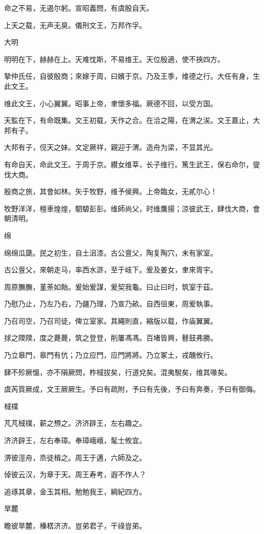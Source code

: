 命之不易，无遏尔躬。宣昭義問，有虞殷自天。

上天之载，无声无臭。儀刑文王，万邦作孚。

大明

明明在下，赫赫在上。天难忱斯，不易维王。天位殷適，使不挾四方。

摯仲氏任，自彼殷商；來嫁于周，曰嬪于京。乃及王季，维德之行。大任有身，生此文王。

维此文王，小心翼翼。昭事上帝，聿懷多福。厥德不回，以受方国。

天監在下，有命既集。文王初载，天作之合。在洽之陽，在渭之涘。文王嘉止，大邦有子。

大邦有子，伣天之妹。文定厥祥，親迎于渭。造舟为梁，不显其光。

有命自天，命此文王。于周于京。纘女维莘，长子维行。篤生武王，保右命尔，燮伐大商。

殷商之旅，其會如林。矢于牧野，维予侯興。上帝臨女，无貳尔心！

牧野洋洋，檀車煌煌，駟騵彭彭。维師尚父，时维鷹揚；涼彼武王，肆伐大商，會朝清明。

绵

绵绵瓜瓞。民之初生，自土沮漆。古公亶父，陶复陶穴，未有家室。

古公亶父，來朝走马，率西水滸，至于岐下。爰及姜女，聿來胥宇。

周原膴膴，堇荼如飴。爰始爰謀，爰契我龜。曰止曰时，筑室于茲。

乃慰乃止，乃左乃右，乃疆乃理，乃宣乃畝。自西徂東，周爰執事。

乃召司空，乃召司徒，俾立室家。其繩則直，縮版以载，作庙翼翼。

捄之陾陾，度之薨薨，筑之登登，削屢馮馮。百堵皆興，鼛鼓弗勝。

乃立皋門，皋門有伉；乃立应門，应門將將。乃立冢土，戎醜攸行。

肆不殄厥慍，亦不隕厥問，柞棫拔矣，行道兌矣。混夷駾矣，维其喙矣。

虞芮質厥成，文王厥厥生。予曰有疏附，予曰有先後，予曰有奔奏，予曰有御侮。

棫樸

芃芃棫樸，薪之槱之。济济辟王，左右趣之。

济济辟王，左右奉璋。奉璋峨峨，髦士攸宜。

淠彼涇舟，烝徒楫之。周王于邁，六師及之。

倬彼云汉，为章于天。周王寿考，遐不作人？

追琢其章，金玉其相。勉勉我王，綱紀四方。

旱麓

瞻彼旱麓，榛楛济济。豈弟君子，干祿豈弟。

